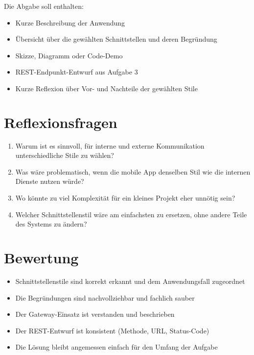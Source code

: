 \documentclass[a4paper,12pt]{article}
\begin{document}
Die Abgabe soll enthalten:

\begin{itemize}
\item Kurze Beschreibung der Anwendung
\item Übersicht über die gewählten Schnittstellen und deren Begründung
\item Skizze, Diagramm oder Code-Demo
\item REST-Endpunkt-Entwurf aus Aufgabe 3
\item Kurze Reflexion über Vor- und Nachteile der gewählten Stile
\end{itemize}

\section*{Reflexionsfragen}

\begin{enumerate}
\item Warum ist es sinnvoll, für interne und externe Kommunikation unterschiedliche Stile zu wählen?
\item Was wäre problematisch, wenn die mobile App denselben Stil wie die internen Dienste nutzen würde?
\item Wo könnte zu viel Komplexität für ein kleines Projekt eher unnötig sein?
\item Welcher Schnittstellenstil wäre am einfachsten zu ersetzen, ohne andere Teile des Systems zu ändern?
\end{enumerate}

\section*{Bewertung}

\begin{itemize}
\item Schnittstellenstile sind korrekt erkannt und dem Anwendungsfall zugeordnet
\item Die Begründungen sind nachvollziehbar und fachlich sauber
\item Der Gateway-Einsatz ist verstanden und beschrieben
\item Der REST-Entwurf ist konsistent (Methode, URL, Status-Code)
\item Die Lösung bleibt angemessen einfach für den Umfang der Aufgabe
\end{itemize}
\end{document}
